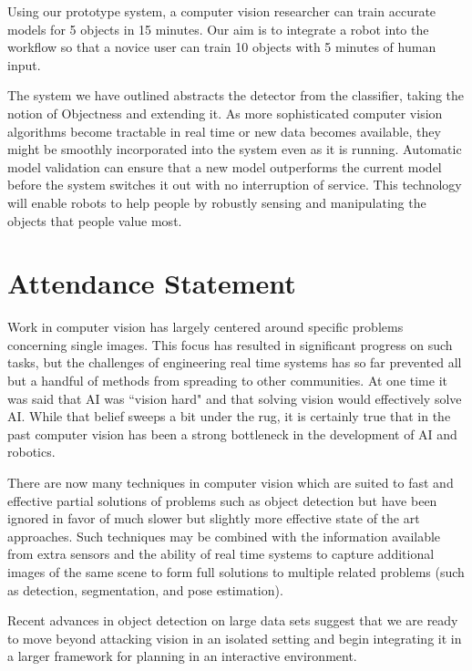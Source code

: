 \documentclass[12pt]{article}
\numberwithin{equation}{section}
\numberwithin{table}{section}
\numberwithin{figure}{section}
\begin{document}
Using our prototype system, a computer vision researcher can train accurate models for 5
objects in 15 minutes. Our aim is to integrate a robot into the workflow so that a novice
user can train 10 objects with 5 minutes of human input.

The system we have outlined abstracts the detector from the classifier, taking the notion of Objectness and
extending it. As more sophisticated computer vision algorithms become tractable in real time or new data becomes
available, they might be smoothly incorporated into the system even as it is running. 
Automatic model validation can ensure that a new model outperforms the current model before the system switches 
it out with no interruption of service. This technology will enable robots to help people by robustly sensing and
manipulating the objects that people value most.

\newpage




\newpage

\section{Attendance Statement}
   Work in computer vision has largely centered around specific problems concerning
single images. This focus has resulted in significant progress on such tasks, but the challenges of 
engineering real time systems has so far prevented all but a handful of methods from spreading 
to other communities. At one time it was said that AI was ``vision hard" and that solving vision would
effectively solve AI. While that belief sweeps a bit under the rug, it is certainly true
that in the past computer vision has been a strong bottleneck in the development of AI and 
robotics. 

There are now many techniques in computer vision which are suited
to fast and effective partial solutions of problems such as object detection
but have been ignored in favor of much slower but slightly more effective state of the art
approaches.  Such techniques may be combined with the information available from
extra sensors and the ability of real time systems to capture additional images of the same scene
to form full solutions to multiple related problems (such as detection, segmentation, and pose estimation). 

Recent advances in object detection on large data sets suggest that we are ready
to move beyond attacking vision in an isolated setting and begin integrating it in a
larger framework for planning in an interactive environment. 
 
\end{document}

